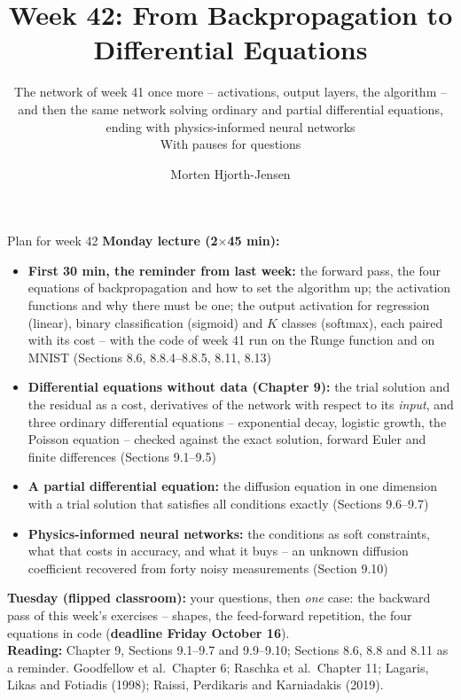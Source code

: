 \documentclass[10pt,aspectratio=169]{beamer}
\title{Week 42: From Backpropagation to Differential Equations}
\subtitle{The network of week 41 once more -- activations, output layers, the
  algorithm -- and then the same network solving ordinary and partial
  differential equations, ending with physics-informed neural networks\\[3pt]
  \small With pauses for questions}
\author{Morten Hjorth-Jensen}
\institute{Department of Physics and Center for Computing in Science Education,\\
  University of Oslo, Norway}
\date{}
\begin{document}
\begin{frame}
\titlepage
\end{frame}

\begin{frame}{Plan for week 42}
\footnotesize
\textbf{Monday lecture (2$\times$45 min):}
\begin{itemize}
  \item \textbf{First 30 min, the reminder from last week:} the forward pass,
        the four equations of backpropagation and how to set the algorithm up;
        the activation functions and why there must be one; the output
        activation for regression (linear), binary classification (sigmoid)
        and $K$ classes (softmax), each paired with its cost -- with the code
        of week 41 run on the Runge function and on MNIST (Sections 8.6,
        8.8.4--8.8.5, 8.11, 8.13)
  \item \textbf{Differential equations without data (Chapter 9):} the trial
        solution and the residual as a cost, derivatives of the network with
        respect to its \emph{input}, and three ordinary differential equations
        -- exponential decay, logistic growth, the Poisson equation --
        checked against the exact solution, forward Euler and finite
        differences (Sections 9.1--9.5)
  \item \textbf{A partial differential equation:} the diffusion equation in
        one dimension with a trial solution that satisfies all conditions
        exactly (Sections 9.6--9.7)
  \item \textbf{Physics-informed neural networks:} the conditions as soft
        constraints, what that costs in accuracy, and what it buys -- an
        unknown diffusion coefficient recovered from forty noisy measurements
        (Section 9.10)
\end{itemize}
\textbf{Tuesday (flipped classroom):} your questions, then \emph{one} case:
the backward pass of this week's exercises -- shapes, the feed-forward
repetition, the four equations in code (\textbf{deadline Friday October
16}).\\[2pt]
\textbf{Reading:} Chapter 9, Sections 9.1--9.7 and 9.9--9.10; Sections 8.6,
8.8 and 8.11 as a reminder.  Goodfellow et al.\ Chapter 6; Raschka et al.\
Chapter 11; Lagaris, Likas and Fotiadis (1998); Raissi, Perdikaris and
Karniadakis (2019).
\end{frame}

\end{document}

